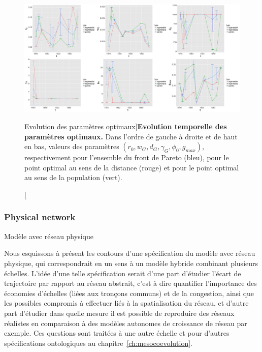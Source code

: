 \begin{figure}
	\includegraphics[width=\linewidth]{Figures/Final/6-2-3-fig-macrocoevol-parameters.jpg}
	\caption[Evolution of optimal parameters][Evolution des paramètres optimaux]{\label{fig:macrocoevol:parameters}}{\textbf{Evolution temporelle des paramètres optimaux.} Dans l'ordre de gauche à droite et de haut en bas, valeurs des paramètres $(r_0,w_G,d_G,\gamma_G,\phi_0,g_{max})$, respectivement pour l'ensemble du front de Pareto (bleu), pour le point optimal au sens de la distance (rouge) et pour le point optimal au sens de la population (vert).\label{fig:macrocoevol:parameters}}
\end{figure}








\subsubsection{Physical network}{Modèle avec réseau physique}


Nous esquissons à présent les contours d'une spécification du modèle avec réseau physique, qui correspondrait en un sens à un modèle hybride combinant plusieurs échelles. L'idée d'une telle spécification serait d'une part d'étudier l'écart de trajectoire par rapport au réseau abstrait, c'est à dire quantifier l'importance des économies d'échelles (liées aux tronçons communs) et de la congestion, ainsi que les possibles compromis à effectuer liés à la spatialisation du réseau, et d'autre part d'étudier dans quelle mesure il est possible de reproduire des réseaux réalistes en comparaison à des modèles autonomes de croissance de réseau par exemple. Ces questions sont traitées à une autre échelle et pour d'autres spécifications ontologiques au chapitre~\ref{ch:mesocoevolution}. 

